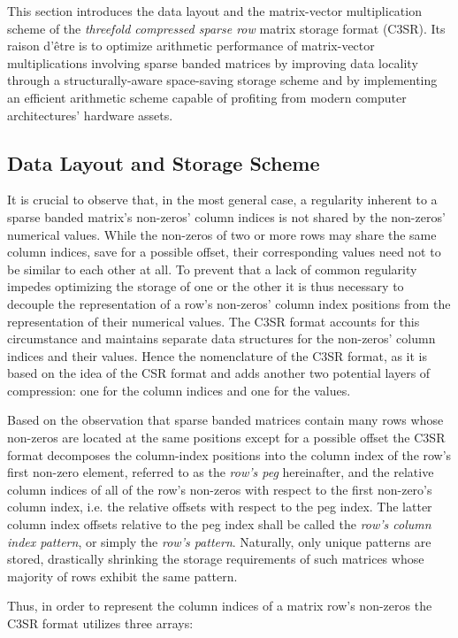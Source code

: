 \documentclass{article}
\begin{document}
  This section introduces the data layout and the matrix-vector multiplication scheme of the \emph{threefold compressed sparse row} matrix storage format (C3SR). Its raison d'être is to optimize arithmetic performance of matrix-vector multiplications involving sparse banded matrices by improving data locality through a structurally-aware space-saving storage scheme and by implementing an efficient arithmetic scheme capable of profiting from modern computer architectures' hardware assets.

  \subsection{Data Layout and Storage Scheme}

    It is crucial to observe that, in the most general case, a regularity inherent to a sparse banded matrix's non-zeros' column indices is not shared by the non-zeros' numerical values. While the non-zeros of two or more rows may share the same column indices, save for a possible offset, their corresponding values need not to be similar to each other at all. To prevent that a lack of common regularity impedes optimizing the storage of one or the other it is thus necessary to decouple the representation of a row's non-zeros' column index positions from the representation of their numerical values. The C3SR format accounts for this circumstance and maintains separate data structures for the non-zeros' column indices and their values. Hence the nomenclature of the C3SR format, as it is based on the idea of the CSR format and adds another two potential layers of compression: one for the column indices and one for the values.

    Based on the observation that sparse banded matrices contain many rows whose non-zeros are located at the same positions except for a possible offset the C3SR format decomposes the column-index positions into the column index of the row's first non-zero element, referred to as the \emph{row's peg} hereinafter, and the relative column indices of all of the row's non-zeros with respect to the first non-zero's column index, i.e. the relative offsets with respect to the peg index. The latter column index offsets relative to the peg index shall be called the \emph{row's column index pattern}, or simply the \emph{row's pattern}. Naturally, only unique patterns are stored, drastically shrinking the storage requirements of such matrices whose majority of rows exhibit the same pattern.

    Thus, in order to represent the column indices of a matrix row's non-zeros the C3SR format utilizes three arrays:
\end{document}
